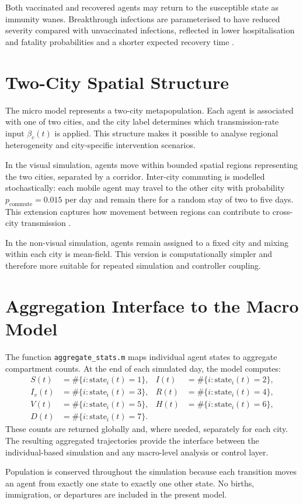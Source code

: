 Both vaccinated and recovered agents may return to the susceptible state as immunity wanes.
Breakthrough infections are parameterised to have reduced severity compared with unvaccinated infections, reflected in lower hospitalisation and fatality probabilities and a shorter expected recovery time \citep{polcz2025}.

\section{Two-City Spatial Structure}
\label{sec:two_city}

The micro model represents a two-city metapopulation.
Each agent is associated with one of two cities, and the city label determines which transmission-rate input $\beta_c(t)$ is applied.
This structure makes it possible to analyse regional heterogeneity and city-specific intervention scenarios.

In the visual simulation, agents move within bounded spatial regions representing the two cities, separated by a corridor.
Inter-city commuting is modelled stochastically: each mobile agent may travel to the other city with probability $p_{\mathrm{commute}} = 0.015$ per day and remain there for a random stay of two to five days.
This extension captures how movement between regions can contribute to cross-city transmission \citep{zhang2025}.

In the non-visual simulation, agents remain assigned to a fixed city and mixing within each city is mean-field.
This version is computationally simpler and therefore more suitable for repeated simulation and controller coupling.

\section{Aggregation Interface to the Macro Model}
\label{sec:aggregation}

The function \texttt{aggregate\_stats.m} maps individual agent states to aggregate compartment counts.
At the end of each simulated day, the model computes:
\begin{align*}
  S(t) &= \#\{i : \mathrm{state}_i(t) = 1\}, &
  I(t) &= \#\{i : \mathrm{state}_i(t) = 2\}, \\
  I_v(t) &= \#\{i : \mathrm{state}_i(t) = 3\}, &
  R(t) &= \#\{i : \mathrm{state}_i(t) = 4\}, \\
  V(t) &= \#\{i : \mathrm{state}_i(t) = 5\}, &
  H(t) &= \#\{i : \mathrm{state}_i(t) = 6\}, \\
  D(t) &= \#\{i : \mathrm{state}_i(t) = 7\}. &
\end{align*}
These counts are returned globally and, where needed, separately for each city.
The resulting aggregated trajectories provide the interface between the individual-based simulation and any macro-level analysis or control layer.

Population is conserved throughout the simulation because each transition moves an agent from exactly one state to exactly one other state.
No births, immigration, or departures are included in the present model.
